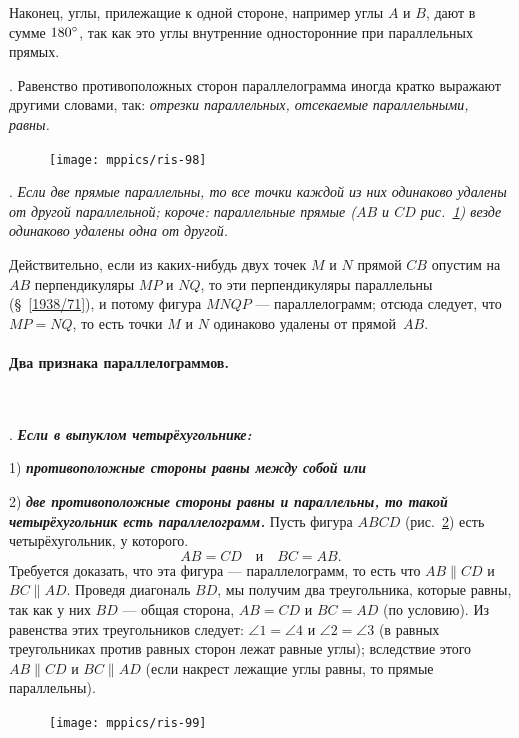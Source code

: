 \documentclass[oneside]{book}
\begin{document}
Наконец, углы, прилежащие к одной стороне, например углы $A$ и $B$, дают в сумме $180\degree$, так как это углы внутренние односторонние при параллельных прямых.

\smallskip
{}.
Равенство противоположных сторон параллелограмма иногда кратко выражают другими словами, так:
\emph{отрезки параллельных, отсекаемые параллельными, равны.}

\begin{figure}
\centering
\vskip-2mm
\texttt{[image: mppics/ris-98]}
\caption{}\label{1938/ris-98}
\end{figure}

\smallskip
\mbox{.}
\emph{Если две прямые параллельны, то все точки каждой из них одинаково удалены от другой параллельной;
короче:
параллельные прямые \emph{($AB$ и $CD$ рис.~\ref{1938/ris-98})} везде одинаково удалены одна от другой.}

Действительно, если из каких-нибудь двух точек $M$ и $N$ прямой $CB$ опустим на $AB$ перпендикуляры $MP$ и $NQ$, то эти перпендикуляры параллельны (§~\ref{1938/71}), и потому фигура $MNQP$ — параллелограмм;
отсюда следует, что $MP=NQ$, то есть точки $M$ и $N$ одинаково удалены от прямой~$AB$.

\paragraph{Два признака параллелограммов.}\label{1938/89}\ 

\smallskip
\mbox{.}
\textbf{\emph{Если в выпуклом четырёхугольнике:}}

1) \textbf{\emph{противоположные стороны равны между собой или}}

2) \textbf{\emph{две противоположные стороны равны и параллельны, то такой четырёхугольник есть параллелограмм.}}
Пусть фигура $ABCD$ (рис.~\ref{1938/ris-99}) есть четырёхугольник, у которого.
\[AB=CD\quad \text{и}\quad BC=AB.\]
Требуется доказать, что эта фигура — параллелограмм, то есть что $AB\parallel CD$ и $BC \parallel AD$.
Проведя диагональ $BD$, мы получим два треугольника, которые равны, так как у них $BD$ — общая сторона, $AB=CD$ и $BC = AD$ (по условию).
Из равенства этих треугольников следует:
$\angle 1 = \angle 4 $ и $\angle 2 = \angle 3$ (в равных треугольниках против равных сторон лежат равные углы);
вследствие этого $AB \parallel CD$ и $BC\parallel AD$ (если накрест лежащие углы равны, то прямые параллельны).

\begin{figure}
\centering
\texttt{[image: mppics/ris-99]}
\caption{}\label{1938/ris-99}
\end{figure}
\end{document}
